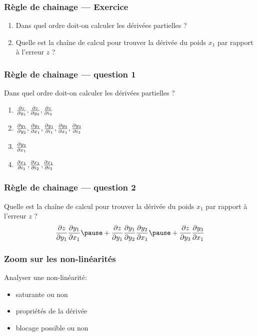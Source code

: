 \documentclass{formation}
\begin{document}
\begin{frame}
  \frametitle{Règle de chainage --- Exercice}

  \begin{enumerate}
  \item Dans quel ordre doit-on calculer les dérivées partielles ?
  \item Quelle est la chaîne de calcul pour trouver la dérivée du
    poids $x_1$ par rapport à l'erreur $z$ ?
  \end{enumerate}
\end{frame}

\begin{frame}
  \frametitle{Règle de chainage --- question 1}
  Dans quel ordre doit-on calculer les dérivées partielles ?
  \pause
  \begin{enumerate}[<+->]
  \item $\partiald{z}{y_1}, \partiald{z}{y_3}, \partiald{z}{i_3}$
  \item
    $\partiald{y_1}{y_2}, \partiald{y_1}{x_1}, \partiald{y_1}{i_1},
    \partiald{y_3}{x_1}, \partiald{y_3}{i_3}$
  \item $\partiald{y_2}{x_1}$
  \item $\partiald{x_1}{i_1}$,$\partiald{x_1}{i_2}$,$\partiald{x_1}{i_3}$
  \end{enumerate}
\end{frame}
\begin{frame}
  \frametitle{Règle de chainage --- question 2}
   Quelle est la chaîne de calcul pour
  trouver la dérivée du
  poids $x_1$ par rapport à l'erreur $z$ ?\\
  \pause
  \[
    \frac{\partial z}{\partial y_1}
    \frac{\partial y_1}{\partial x_1}
    \pause
    +
    \frac{\partial z}{\partial y_1}\frac{\partial y_1}{\partial
      y_2}\frac{\partial y_2}{\partial x_1}
    \pause
    +
    \frac{\partial z}{\partial y_3}
    \frac{\partial y_3}{\partial x_1}
  \]
\end{frame}

\begin{frame}
  \frametitle{Zoom sur les non-linéarités}
  Analyser une non-linéarité:
  \begin{itemize}
  \item saturante ou non
  \item propriétés de la dérivée
  \item blocage possible ou non
  \end{itemize}
\end{frame}
\end{document}
